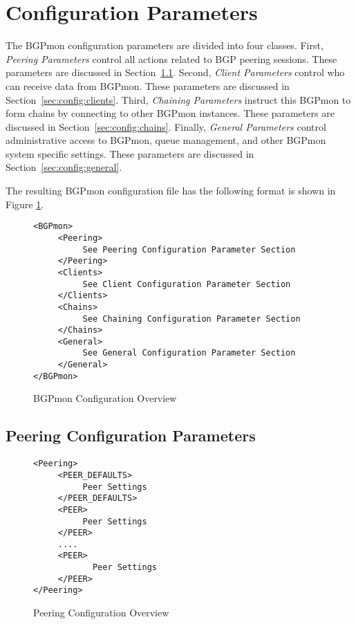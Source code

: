 \section{Configuration Parameters}
\label{sec:config:overall}

The BGPmon configuration parameters are divided into four classes.   First,  \emph{Peering Parameters} control all actions related to BGP peering sessions.   These parameters are discussed in Section~\ref{sec:config:peers}.     Second,  \emph{Client Parameters} control who can receive data from BGPmon.   These parameters are discussed in Section~\ref{sec:config:clients}.  Third, \emph{Chaining Parameters} instruct this BGPmon to form chains by connecting to other BGPmon instances.  These parameters are discussed in Section~\ref{sec:config:chains}.   Finally, \emph{General Parameters} control administrative access to BGPmon,  queue management, and other BGPmon system specific settings.   These parameters are discussed in Section~\ref{sec:config:general}.  

The resulting BGPmon configuration file has the following format is shown in Figure \ref{fig:config:overview}. 

\begin{figure}[!htb]
\begin{verbatim}
<BGPmon>
     <Peering>
          See Peering Configuration Parameter Section
     </Peering>
     <Clients>
          See Client Configuration Parameter Section
     </Clients>
     <Chains>
          See Chaining Configuration Parameter Section
     </Chains>
     <General>
          See General Configuration Parameter Section
     </General>
</BGPmon>
\end{verbatim}
\caption{BGPmon Configuration Overview}
\label{fig:config:overview}
\end{figure}

\subsection{Peering Configuration Parameters}
\label{sec:config:peers}

\begin{figure}[!htb]
\begin{verbatim}
<Peering>
     <PEER_DEFAULTS>
          Peer Settings
     </PEER_DEFAULTS>
     <PEER>
          Peer Settings
     </PEER>
     ....
     <PEER>
            Peer Settings
     </PEER>
</Peering>
\end{verbatim}
\caption{Peering Configuration Overview}
\label{fig:config:peer:overview}
\end{figure}

